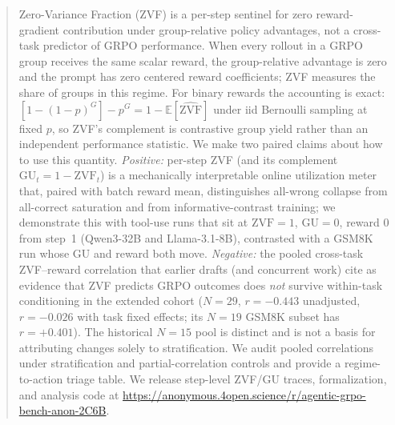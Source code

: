 \begin{abstract}
Zero-Variance Fraction (ZVF) is a per-step sentinel for zero reward-gradient
contribution under group-relative policy advantages, not a cross-task
predictor of GRPO performance. When every rollout in a GRPO group receives
the same scalar reward, the group-relative advantage is zero and the prompt
has zero centered reward coefficients; ZVF measures the share of groups in this regime. For
binary rewards the accounting is exact:
$[1-(1-p)^G]-p^G=1-\mathbb E[\widehat{\mathrm{ZVF}}]$ under iid Bernoulli sampling at fixed $p$, so ZVF's complement is
contrastive group yield rather than an independent performance statistic.
We make two paired claims about how to use this quantity. \emph{Positive:}
per-step ZVF (and its complement $\mathrm{GU}_t = 1-\mathrm{ZVF}_t$) is a
mechanically interpretable online utilization meter that, paired with batch
reward mean, distinguishes all-wrong collapse from all-correct saturation
and from informative-contrast training; we demonstrate this with tool-use
runs that sit at $\mathrm{ZVF}{=}1$, $\mathrm{GU}{=}0$, reward $0$ from
step~1 (Qwen3-32B and Llama-3.1-8B), contrasted with a GSM8K run whose
GU and reward both move. \emph{Negative:} the pooled cross-task ZVF--reward
correlation that earlier drafts (and concurrent work) cite as evidence that
ZVF predicts GRPO outcomes does \emph{not} survive within-task
conditioning in the extended cohort ($N=29$, $r=-0.443$ unadjusted,
$r=-0.026$ with task fixed effects; its $N=19$ GSM8K subset has $r=+0.401$).
The historical $N=15$ pool is distinct and is not a basis for attributing
changes solely to stratification. We audit pooled correlations under stratification
and partial-correlation controls and provide a regime-to-action triage table.
We release step-level ZVF/GU traces, formalization, and analysis code at
\url{https://anonymous.4open.science/r/agentic-grpo-bench-anon-2C6B}.
\end{abstract}

